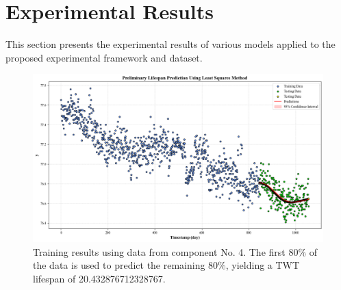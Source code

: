 \section{Experimental Results}
\label{sec:Experimental Results}
This section presents the experimental results of various models applied to the proposed experimental framework and dataset.

\begin{figure}[H]
	\centering
	\includegraphics[width=\linewidth]{figures/sourceModelTraining_Prediction}
	\caption{Training results using data from component No. 4. The first 80\% of the data is used to predict the remaining 80\%, yielding a TWT lifespan of 20.432876712328767.}

	\label{fig:sourceModelTraining_Prediction}
\end{figure}